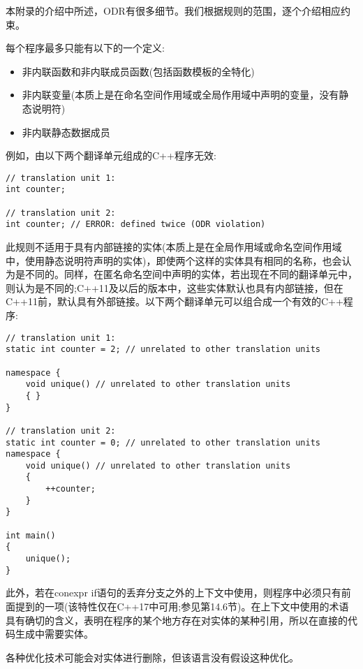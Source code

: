 
本附录的介绍中所述，ODR有很多细节。我们根据规则的范围，逐个介绍相应约束。


每个程序最多只能有以下的一个定义:

\begin{itemize}
\item 
非内联函数和非内联成员函数(包括函数模板的全特化)

\item 
非内联变量(本质上是在命名空间作用域或全局作用域中声明的变量，没有静态说明符)

\item 
非内联静态数据成员
\end{itemize}

例如，由以下两个翻译单元组成的C++程序无效:

\begin{lstlisting}[style=styleCXX]
// translation unit 1:
int counter;

// translation unit 2:
int counter; // ERROR: defined twice (ODR violation)
\end{lstlisting}

此规则不适用于具有内部链接的实体(本质上是在全局作用域或命名空间作用域中，使用静态说明符声明的实体)，即使两个这样的实体具有相同的名称，也会认为是不同的。同样，在匿名命名空间中声明的实体，若出现在不同的翻译单元中，则认为是不同的;C++11及以后的版本中，这些实体默认也具有内部链接，但在C++11前，默认具有外部链接。以下两个翻译单元可以组合成一个有效的C++程序:

\begin{lstlisting}[style=styleCXX]
// translation unit 1:
static int counter = 2; // unrelated to other translation units

namespace {
	void unique() // unrelated to other translation units
	{ }
}

// translation unit 2:
static int counter = 0; // unrelated to other translation units
namespace {
	void unique() // unrelated to other translation units
	{
		++counter;
	}
}

int main()
{
	unique();
}
\end{lstlisting}

此外，若在conexpr if语句的丢弃分支之外的上下文中使用，则程序中必须只有前面提到的一项(该特性仅在C++17中可用;参见第14.6节)。在上下文中使用的术语具有确切的含义，表明在程序的某个地方存在对实体的某种引用，所以在直接的代码生成中需要实体。

\begin{tcolorbox}[colback=webgreen!5!white,colframe=webgreen!75!black]
\hspace*{0.75cm}各种优化技术可能会对实体进行删除，但该语言没有假设这种优化。
\end{tcolorbox}

